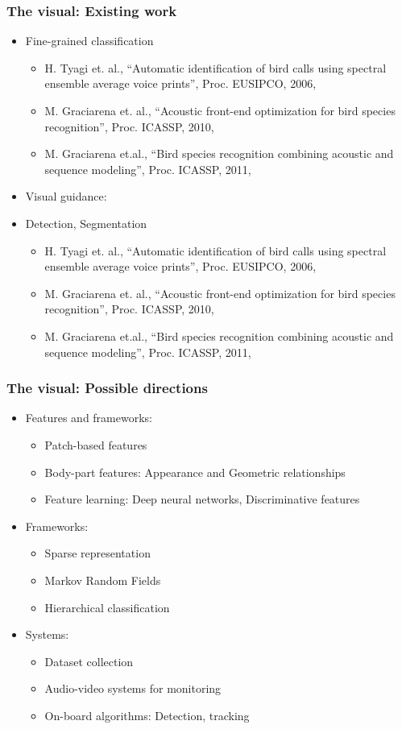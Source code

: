 \documentclass[mathserif]{beamer}
\renewcommand{\footnotesize}{\scriptsize}
\begin{document}
\begin{frame}
\footnotesize
\frametitle{The visual: Existing work}
\begin{itemize}
	\item<2-> Fine-grained classification 
	\begin{itemize}
	\footnotesize
	\item H. Tyagi et. al., ``Automatic identification of bird calls using spectral 
	ensemble average voice prints'', Proc. EUSIPCO, 2006,
	\item M. Graciarena et. al., ``Acoustic front-end optimization for bird species recognition'', 
	Proc. ICASSP, 2010, 
	\item M. Graciarena et.al., ``Bird species recognition combining acoustic and sequence modeling'', 
	Proc. ICASSP, 2011, 
	\end{itemize}	
	\item<3-> Visual guidance: 
	\item<4-> Detection, Segmentation
	\begin{itemize}
	\footnotesize
	\item H. Tyagi et. al., ``Automatic identification of bird calls using spectral 
	ensemble average voice prints'', Proc. EUSIPCO, 2006,
	\item M. Graciarena et. al., ``Acoustic front-end optimization for bird species recognition'', 
	Proc. ICASSP, 2010, 
	\item M. Graciarena et.al., ``Bird species recognition combining acoustic and sequence modeling'', 
	Proc. ICASSP, 2011, 
	\end{itemize}
\end{itemize}
\end{frame}

\begin{frame}
\frametitle{The visual: Possible directions}
\begin{itemize}
\item<2-> Features and frameworks: 
\begin{itemize}
\item Patch-based features 
\item Body-part features: Appearance and Geometric relationships
\item Feature learning: Deep neural networks, Discriminative features
\end{itemize}
\item<3-> Frameworks:
\begin{itemize}
\item Sparse representation
\item Markov Random Fields
\item Hierarchical classification 
\end{itemize}
\item<4-> Systems:
\begin{itemize}
\item Dataset collection
\item Audio-video systems for monitoring
\item On-board algorithms: Detection, tracking
\end{itemize}
\end{itemize}
\end{frame}
\end{document}
